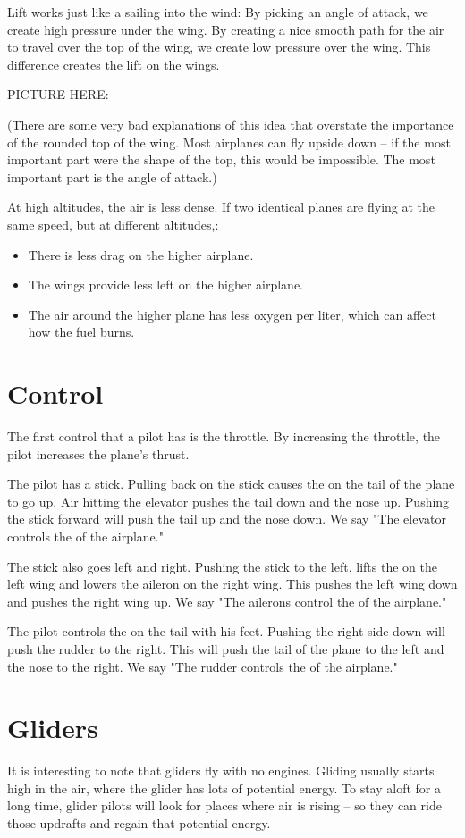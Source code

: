 Lift works just like a sailing into the wind: By picking an angle of attack,   we create high pressure under the wing.  By creating a nice smooth path for the 
air to travel over the top of the wing,  we create low pressure over the wing.  This difference creates the lift on the wings.

PICTURE HERE:

(There are some very bad explanations of this idea that overstate the importance of the rounded top of the wing.   Most airplanes can fly upside down -- if the 
most important part were the shape of the top,  this would be impossible.  The most important part is the angle of attack.)

At high altitudes,  the air is less dense.  If two identical planes are flying  at the same speed,  but at different altitudes,: 
\begin{itemize}
\item There is less drag on the higher airplane.
\item The wings provide less left on the higher airplane.
\item The air around the higher plane has less oxygen per liter,  which can affect how the fuel burns.
\end{itemize}

\section{Control}

The first control that a pilot has is the throttle.   By increasing the throttle,  the pilot increases the plane's thrust.

The pilot has a stick.  Pulling back on the stick causes the  on the tail of the plane to go up.  Air hitting the elevator pushes the tail down and the nose up. 
Pushing the stick forward will push the tail up and the nose down.  We say "The elevator controls the  of the airplane."

The stick also goes left and right.   Pushing the stick to the left,  lifts the  on the left wing and lowers the aileron on the right wing.  This pushes the left wing down and 
pushes the right wing up.  We say "The ailerons control the   of the airplane."

The pilot controls the  on the tail with his feet.   Pushing the right side down will push the rudder to the right.  This will push the tail of the plane to the left and the 
nose to the right.  We say "The rudder controls the  of the airplane."

\section{Gliders}

It is interesting to note that gliders fly with no engines.   Gliding usually starts high in the air,  where the glider has lots of potential energy.   To stay aloft for a long
time,  glider pilots will look for places where air is rising -- so they can ride those updrafts and regain that potential energy.

